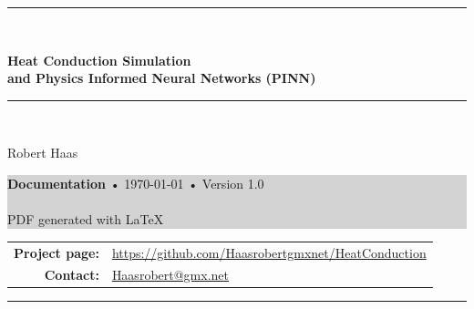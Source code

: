 \documentclass[a4paper,11pt]{article}
\theoremstyle{plain} %
\theoremstyle{definition} %
\theoremstyle{remark} %
\theoremstyle{remark}
\begin{document}
\begin{titlepage}
    \centering

    \vspace*{1cm}
    {\color{mainblue} \rule{1.0\textwidth}{2pt}}\\[0.5cm]

    {\Huge\bfseries Heat Conduction Simulation\\[0.3em]
    and Physics Informed Neural Networks (PINN)\par}
    
    \vspace*{0.5cm}
    {\color{mainblue} \rule{1.0\textwidth}{2pt}}\\[1.5cm]
    
    \vspace{1cm}

    {\Large Robert Haas}\\[0.3em]

    \vspace{4cm}
    \colorbox{lightgray}{
        \parbox{0.8\textwidth}{
            \vspace{1em}
            \centering
            {\normalsize\textbf{Documentation} • \today{ }• Version 1.0}\\[0.5em]
            {}\\[0.5em]
            {\small PDF generated with \LaTeX}
            \vspace{1em}
        }
    }

    \vfill

    {\footnotesize
    \begin{tabular}{rl}
    \textbf{Project page:} & \href{https://github.com/Haasrobertgmxnet/HeatConduction}{https://github.com/Haasrobertgmxnet/HeatConduction}\\
    \textbf{Contact:} & \href{mailto:Haasrobert@gmx.net}{Haasrobert@gmx.net} \\
    \end{tabular}
    }

    \vspace{2cm}
    {\color{mainblue} \rule{1.0\textwidth}{2pt}}  %
\end{titlepage}
\end{document}
